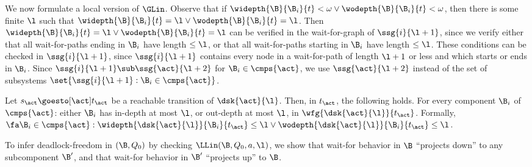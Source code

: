 We now formulate a local version of $\GLin$.
Observe that if
$\widepth{\B}{\B_i}{t} < \omega \lor \wodepth{\B}{\B_i}{t} < \omega$,
then there is some finite $\l$ such that 
$\widepth{\B}{\B_i}{t} = \l \lor \wodepth{\B}{\B_i}{t} = \l$.
Then $\widepth{\B}{\B_i}{t} = \l \lor \wodepth{\B}{\B_i}{t} = \l$ can be verified in 
the wait-for-graph of 
$\ssg{i}{\l+1}$, since we verify either that all wait-for-paths ending in $\B_i$
have length $\le \l$, or that 
all wait-for-paths starting in $\B_i$ 
have length $\le \l$.
These conditions can be checked in $\ssg{i}{\l+1}$, since $\ssg{i}{\l+1}$
contains every node in a
wait-for-path of length $\l+1$ or less and which starts or ends in $\B_i$.
%
Since $\ssg{i}{\l+1} \sub \ssg{\act}{\l+2}$ for $\B_i \in \cmps{\act}$, we use 
$\ssg{\act}{\l+2}$ instead of the set of subsystems 
$\set{\ssg{i}{\l+1} : \B_i \in \cmps{\act}}$. 




 \label{def:ldfc-k}
Let $s_\act \goesto[\act] t_\act$ be a reachable transition of $\dsk{\act}{\l}$.
Then, in $t_\act$, the following holds. 
For every component $\B_i$ of $\cmps{\act}$:  
either $\B_i$ has in-depth at most $\l$, or out-depth at most $\l$, in $\wfg{\dsk{\act}{\l}}{t_\act}$. 
Formally,\\
\ind  $\fa \B_i \in \cmps{\act}: 
\widepth{\dsk{\act}{\l}}{\B_i}{t_\act} \le \l \lor \wodepth{\dsk{\act}{\l}}{\B_i}{t_\act} \le \l$.
\ed


To infer deadlock-freedom in $(\B, Q_0)$ by checking $\LLin(\B, Q_0, a, \l)$,
 we show that wait-for behavior in $\B$ ``projects down''
to any subcomponent $\B'$, and that wait-for behavior in $\B'$ ``projects up'' to $\B$.


